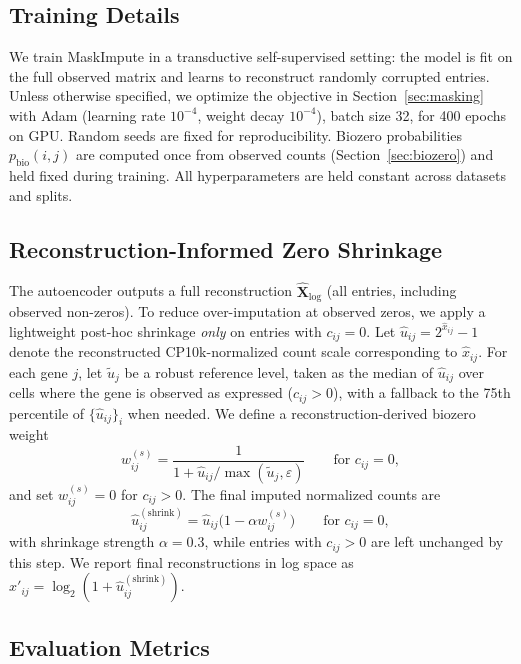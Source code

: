 \documentclass{article}
\theoremstyle{plain}
\theoremstyle{definition}
\theoremstyle{remark}
\begin{document}
\subsection{Training Details}
We train MaskImpute in a transductive self-supervised setting: the model is fit
on the full observed matrix and learns to reconstruct randomly corrupted
entries. Unless otherwise specified, we optimize the objective in
Section~\ref{sec:masking} with Adam (learning rate $10^{-4}$, weight decay
$10^{-4}$), batch size 32, for 400 epochs on GPU. Random seeds are fixed for
reproducibility. Biozero probabilities $p_{\mathrm{bio}}(i,j)$ are computed once
from observed counts (Section~\ref{sec:biozero}) and held fixed during training.
All hyperparameters are held constant across datasets and splits.

\subsection{Reconstruction-Informed Zero Shrinkage}
\label{sec:zero_shrink}
The autoencoder outputs a full reconstruction $\hat{\mathbf{X}}_{\log}$ (all
entries, including observed non-zeros). To reduce over-imputation at observed
zeros, we apply a lightweight post-hoc shrinkage \emph{only} on entries with
$c_{ij}=0$. Let $\hat{u}_{ij}=2^{\hat{x}_{ij}}-1$ denote the reconstructed
CP10k-normalized count scale corresponding to $\hat{x}_{ij}$. For each gene $j$,
let $\tilde{u}_j$ be a robust reference level, taken as the median of
$\hat{u}_{ij}$ over cells where the gene is observed as expressed ($c_{ij}>0$),
with a fallback to the 75th percentile of $\{\hat{u}_{ij}\}_i$ when needed.
We define a reconstruction-derived biozero weight
\[
w^{(s)}_{ij}=\frac{1}{1+\hat{u}_{ij}/\max(\tilde{u}_j,\varepsilon)}\qquad\text{for }c_{ij}=0,
\]
and set $w^{(s)}_{ij}=0$ for $c_{ij}>0$. The final imputed normalized counts are
\[
\hat{u}^{(\mathrm{shrink})}_{ij}=\hat{u}_{ij}\big(1-\alpha w^{(s)}_{ij}\big)\qquad\text{for }c_{ij}=0,
\]
with shrinkage strength $\alpha=0.3$, while entries with $c_{ij}>0$ are left
unchanged by this step. We report final reconstructions in log space as
$x'_{ij}=\log_2(1+\hat{u}^{(\mathrm{shrink})}_{ij})$.

\subsection{Evaluation Metrics}
\label{sec:evaluation}
\end{document}
